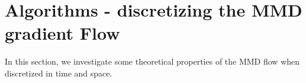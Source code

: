 \section{Algorithms - discretizing the MMD gradient Flow}\label{sec:discretized_flow}

In this section, we investigate some theoretical properties of the MMD flow when discretized in time and space.



